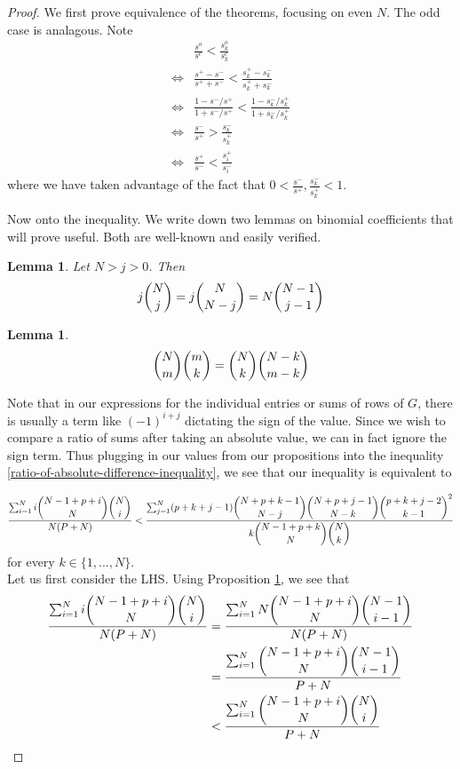 \documentclass[11pt]{article}
\newtheorem{lem}[thm]{Lemma}
\theoremstyle{definition}
\theoremstyle{remark}
\numberwithin{equation}{section}
\begin{document}
\begin{proof}
We first prove equivalence of the theorems, focusing on even $N$. The odd case is analagous. Note 
\begin{align*}
&\frac{s^o}{s^e} < \frac{s^o_k}{s^e_k} \\
\iff & \frac{s^+ - s^-}{s^+ +s^-} <\frac{s^+_k - s^-_k}{s^+_k +s^-_k} \\
\iff& \frac{1-s^-/s^+}{1+s^-/s^+} < \frac{1-s^-_k /s^+_k}{1+s^-_k/s^+_k} \\
\iff & \frac{s^-}{s^+} > \frac{s^-_k}{s^+_k}\\
\iff & \frac{s^+}{s^-} < \frac{s_i^+}{s_i^-}
\end{align*} where we have taken advantage of the fact that $0<\frac{s^-}{s^+}, \frac{s^-_k}{s^+_k}<1$.

Now onto the inequality. We write down two lemmas on binomial coefficients that will prove useful. Both are well-known and easily verified.
\begin{lem}\label{absorption-combination}
Let $N>j>0$. Then 
\[ j \dbinom{N}{j} = j \dbinom{N}{N-j} = N \dbinom{N-1}{j-1}\]
\end{lem} 

\begin{lem}\label{subset-of-a-subset-combination}
\[ \dbinom{N}{m} \dbinom{m}{k} = \dbinom{N}{k} \dbinom{N-k}{m-k} \]
\end{lem} 
\bigskip


Note that in our expressions for the individual entries or sums of rows of $G$, there is usually a term like $(-1)^{i+j}$ dictating the sign of the value. Since we wish to compare a ratio of sums after taking an absolute value, we can in fact ignore the sign term. Thus plugging in our values from our propositions into the inequality \ref{ratio-of-absolute-difference-inequality}, we see that our inequality is equivalent to 

\begin{equation}\label{inequality-all-expressions}
\frac{\sum_{i=1}^N i \dbinom{N-1+p+i}{N} \dbinom{N}{i}}{N(P+N)} < \frac{\sum_{j=1}^N (p+k+j-1) \dbinom{N+p+k-1}{N-j} \dbinom{N+p+j-1}{N-k} \dbinom{p+k+j-2}{k-1}^2 }{k \dbinom{N-1+p+k}{N}\dbinom{N}{k}} 
\end{equation}  for every $k\in \{ 1,...,N\}$.\\

Let us first consider the LHS. Using Proposition \ref{absorption-combination}, we see that 
\begin{align}
\frac{\sum_{i=1}^N i \dbinom{N-1+p+i}{N} \dbinom{N}{i}}{N(P+N)}  &= \frac{\sum_{i=1}^N N \dbinom{N-1+p+i}{N}  \dbinom{N-1}{i-1}}{N(P+N)} \\
&= \frac{\sum_{i=1}^N\dbinom{N-1+p+i}{N}  \dbinom{N-1}{i-1}}{P+N} \\
&< \frac{\sum_{i=1}^N\dbinom{N-1+p+i}{N}  \dbinom{N}{i}}{P+N} \label{LHS-upper-bound}
\end{align}


\end{proof}
\end{document}
